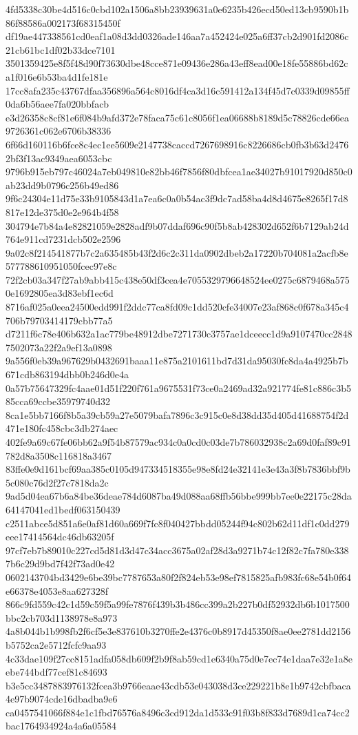 {4fd5338c30be4d516c0cbd102a1506a8bb23939631a0e6235b426ecd50ed13cb9590b1b86f88586a002173f68315450f
df19ae447338561cd0eaf1a08d3dd0326ade146aa7a452424e025a6ff37cb2d901fd2086c21cb61bc1df02b33dce7101
3501359425e8f5f48d90f73630dbe48cce871e09436e286a43eff8ead00e18fe55886bd62ca1f016e6b53ba4d1fe181e
17cc8afa235c43767dfaa356896a564c8016df4ca3d16c591412a134f45d7c0339d09855ff0da6b56aee7fa020bbfacb
e3d26358c8cf81e6f084b9afd372e78faca75c61c8056f1ea06688b8189d5c78826cde66ea9726361c062e6706b38336
6f66d160116b6fce8c4ec1ee5609e2147738caccd7267698916c8226686cb0fb3b63d24762bf3f13ac9349aea6053cbc
9796b915eb797c46024a7eb049810e82bb46f7856f80dbfcea1ae34027b91017920d850c0ab23dd9b0796c256b49ed86
9f6c24304e11d75e33b9105843d1a7ea6c0a0b54ac3f9dc7ad58ba4d8d4675e8265f17d8817e12de375d0e2e964b4f58
304794e7b84a4e82821059e2828adf9b07ddaf696c90f5b8ab428302d652f6b7129ab24d764e911cd7231dcb502e2596
9a02c8f214541877b7c2a635485b43f2d6c2c311da0902dbeb2a17220b704081a2acfb8e577788610951050fcec97e8c
72f2cb03a347f27ab9abb415c438e50df3cea4e7055329796648524ee0275c6879468a5750e1692805ea3d83ebf1ec6d
8716af025a0eea24500edd991f2ddc77ca8fd09c1dd520cfe34007e23af868c0f678a345c4706b79703414179cbb77a5
d7211f6c78e406b632a1ac779be48912dbe7271730c3757ae1dceecc1d9a9107470cc28487502073a22f2a9ef13a0898
9a556f0eb39a967629b0432691baaa11e875a2101611bd7d31da95030fc8da4a4925b7b671cdb863194dbb0b246d0e4a
0a57b75647329fc4aae01d51f220f761a9675531f73ce0a2469ad32a921774fe81c886c3b585cca69ccbe35979740d32
8ca1e5bb7166f8b5a39cb59a27e5079bafa7896c3c915c0e8d38dd35d405d41688754f2d471e180fc458cbc3db274aec
402fe9a69c67fe06bb62a9f54b87579ac934c0a0cd0c03de7b786032938c2a69d0faf89c91782d8a3508c116818a3467
83ffe0e9d161bcf69aa385c0105d947334518355e98e8fd24e32141e3e43a3f8b7836bbf9b5c080c76d2f27c7818da2c
9ad5d04ea67b6a84be36deae784d6087ba49d088aa68ffb56bbe999bb7ee0e22175c28da64147041ed1bedf063150439
c2511abce5d851a6e0af81d60a669f7fc8f040427bbdd05244f94c802b62d11df1c0dd279eee17414564dc46db63205f
97cf7eb7b89010c227cd5d81d3d47c34acc3675a02af28d3a9271b74c12f82c7fa780e3387b6c29d9bd7f42f73ad0e42
0602143704bd3429e6be39bc7787653a80f2f824eb53e98ef7815825afb983fc68e54b0f64e66378e4053e8aa627328f
866c9fd559c42c1d59c59f5a99fe7876f439b3b486cc399a2b227b0df52932db6b1017500bbc2cb703d1138978e8a973
4a8b044b1b998fb2f6cf5e3e837610b3270ffe2e4376c0b8917d45350f8ae0ee2781dd2156b5752ca2e5712fcfc9aa93
4c33dae109f27cc8151adfa058db609f2b9f8ab59cd1e6340a75d0e7ec74e1daa7e32e1a8eebe744bdf77cef81c84693
b3e5cc3487883976132fcea3b9766eaae43cdb53e043038d3ce229221b8e1b9742cbfbaca4e97b9074cde16dbadba9e6
ca0457541066f884e1c1fbd76576a8496c3cd912da1d533c91f03b8f833d7689d1ca74cc2bac1764934924a4a6a05584
}
